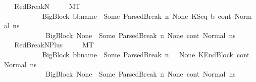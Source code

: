 \begin{isabellebody}
\isanewline
\ \ {\isacharbar}{\kern0pt}\ RedBreakN{\isacharcolon}{\kern0pt}\ \isanewline
\ \ \ \ {\isachardoublequoteopen}M{\isacharcomma}{\kern0pt}{\isasymLambda}{\isacharcomma}{\kern0pt}{\isasymGamma}{\isacharcomma}{\kern0pt}{\isasymOmega}{\isacharcomma}{\kern0pt}T\ {\isasymturnstile}\ \isanewline
\ \ \ \ \ \ \ \ \ \ \ {\isasymlangle}{\isacharparenleft}{\kern0pt}{\isacharparenleft}{\kern0pt}BigBlock\ bb{\isacharunderscore}{\kern0pt}name\ {\isacharbrackleft}{\kern0pt}{\isacharbrackright}{\kern0pt}\ {\isacharparenleft}{\kern0pt}Some\ {\isacharparenleft}{\kern0pt}ParsedBreak\ n{\isacharparenright}{\kern0pt}{\isacharparenright}{\kern0pt}\ None{\isacharparenright}{\kern0pt}{\isacharcomma}{\kern0pt}\ {\isacharparenleft}{\kern0pt}KSeq\ b\ cont{}{\isacharparenright}{\kern0pt}{\isacharcomma}{\kern0pt}\ Normal\ n{\isacharunderscore}{\kern0pt}s{\isacharparenright}{\kern0pt}{\isasymrangle}\ {\isasymlongrightarrow}\ \isanewline
\ \ \ \ \ \ \ \ \ \ \ \ {\isacharparenleft}{\kern0pt}{\isacharparenleft}{\kern0pt}BigBlock\ None\ {\isacharbrackleft}{\kern0pt}{\isacharbrackright}{\kern0pt}\ {\isacharparenleft}{\kern0pt}Some\ {\isacharparenleft}{\kern0pt}ParsedBreak\ n{\isacharparenright}{\kern0pt}{\isacharparenright}{\kern0pt}\ None{\isacharparenright}{\kern0pt}{\isacharcomma}{\kern0pt}\ cont{}{\isacharcomma}{\kern0pt}\ Normal\ n{\isacharunderscore}{\kern0pt}s{\isacharparenright}{\kern0pt}{\isachardoublequoteclose}\isanewline
\isanewline
\ \ {\isacharbar}{\kern0pt}\ RedBreakNPlus{}{\isacharcolon}{\kern0pt}\ \isanewline
\ \ \ \ {\isachardoublequoteopen}M{\isacharcomma}{\kern0pt}{\isasymLambda}{\isacharcomma}{\kern0pt}{\isasymGamma}{\isacharcomma}{\kern0pt}{\isasymOmega}{\isacharcomma}{\kern0pt}T\ {\isasymturnstile}\ \isanewline
\ \ \ \ \ \ \ \ \ \ \ {\isasymlangle}{\isacharparenleft}{\kern0pt}{\isacharparenleft}{\kern0pt}BigBlock\ bb{\isacharunderscore}{\kern0pt}name\ {\isacharbrackleft}{\kern0pt}{\isacharbrackright}{\kern0pt}\ {\isacharparenleft}{\kern0pt}Some\ {\isacharparenleft}{\kern0pt}ParsedBreak\ {\isacharparenleft}{\kern0pt}n\ {\isacharplus}{\kern0pt}\ {}{\isacharparenright}{\kern0pt}{\isacharparenright}{\kern0pt}{\isacharparenright}{\kern0pt}\ None{\isacharparenright}{\kern0pt}{\isacharcomma}{\kern0pt}\ {\isacharparenleft}{\kern0pt}KEndBlock\ cont{}{\isacharparenright}{\kern0pt}{\isacharcomma}{\kern0pt}\ Normal\ n{\isacharunderscore}{\kern0pt}s{\isacharparenright}{\kern0pt}{\isasymrangle}\ {\isasymlongrightarrow}\ \isanewline
\ \ \ \ \ \ \ \ \ \ \ \ {\isacharparenleft}{\kern0pt}{\isacharparenleft}{\kern0pt}BigBlock\ None\ {\isacharbrackleft}{\kern0pt}{\isacharbrackright}{\kern0pt}\ {\isacharparenleft}{\kern0pt}Some\ {\isacharparenleft}{\kern0pt}ParsedBreak\ n{\isacharparenright}{\kern0pt}{\isacharparenright}{\kern0pt}\ None{\isacharparenright}{\kern0pt}{\isacharcomma}{\kern0pt}\ cont{}{\isacharcomma}{\kern0pt}\ Normal\ n{\isacharunderscore}{\kern0pt}s{\isacharparenright}{\kern0pt}{\isachardoublequoteclose}\isanewline

\end{isabellebody}
